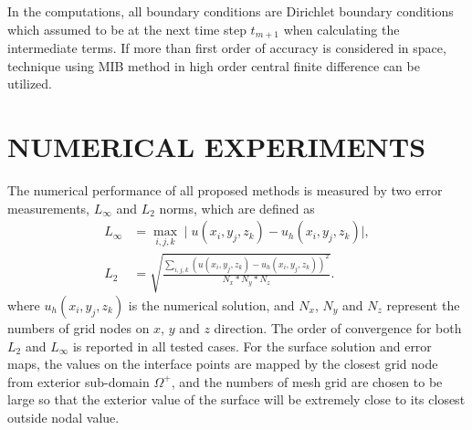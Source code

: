 \documentclass[dissertation]{uathesis}
\begin{document}
\begin{body}
\begin{flushleft}
\hspace{1cm} In the computations, all boundary conditions are Dirichlet boundary conditions which assumed to be at the next time step $t_{m+1}$ when calculating the intermediate terms. If more than first order of accuracy is considered in space, technique \cite{zhao2009matched} using MIB method in high order central finite difference can be utilized.

\end{flushleft}

\chapter{\MakeUppercase{Numerical experiments}}

\begin{flushleft}

\hspace{1cm} The numerical performance of all proposed methods is measured by two error measurements, $L_{\infty}$ and $L_2$ norms, which are defined as 
\begin{align}
L_{\infty} &= \max_{i,j,k} \mid u(x_{i},y_{j},z_{k}) - u_h(x_{i},y_{j},z_{k})\mid,  \\
L_2 &= \sqrt{\frac{\sum_{i,j,k} (u(x_{i},y_{j},z_{k}) - u_h(x_{i},y_{j},z_{k}))^2}{N_{x}*N_{y}*N_{z}}}.
\end{align}
where $u_h(x_{i},y_{j},z_{k})$ is the numerical solution, and
$N_{x}$, $N_{y}$ and $N_{z}$ represent the numbers of grid nodes on $x$, $y$ and $z$ direction. The order of convergence for both $L_2$ and $L_{\infty}$ is reported in all tested cases. For the surface solution and error maps, the values on the interface points are mapped by the closest grid node from exterior sub-domain $\Omega^{+}$, and the numbers of mesh grid are chosen to be large so that the exterior value of the surface will be extremely close to its closest outside nodal value.


\end{flushleft}
\end{body}
\end{document}
